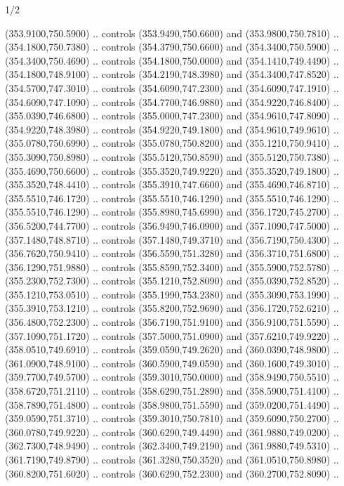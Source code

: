 \begin{flagdescription}{1/2}
\begin{scope}[xshift=0.5\flaglength]
\begin{scope}[scale=0.00745\flagwidth,xshift=-12.1mm,yshift=41.7mm]
\begin{scope}[y=0.80pt, x=0.80pt, yscale=-1, xscale=1, inner sep=0pt, outer sep=0pt]
\begin{scope}[cm={{1.33333,0.0,0.0,-1.33333,(0.0,114.66667)}}]
\begin{scope}[scale=0.100]
  (353.9100,750.5900) .. controls (353.9490,750.6600) and (353.9800,750.7810) ..
  (354.1800,750.7380) .. controls (354.3790,750.6600) and (354.3400,750.5900) ..
  (354.3400,750.4690) .. controls (354.1800,750.0000) and (354.1410,749.4490) ..
  (354.1800,748.9100) .. controls (354.2190,748.3980) and (354.3400,747.8520) ..
  (354.5700,747.3010) .. controls (354.6090,747.2300) and (354.6090,747.1910) ..
  (354.6090,747.1090) .. controls (354.7700,746.9880) and (354.9220,746.8400) ..
  (355.0390,746.6800) .. controls (355.0000,747.2300) and (354.9610,747.8090) ..
  (354.9220,748.3980) .. controls (354.9220,749.1800) and (354.9610,749.9610) ..
  (355.0780,750.6990) .. controls (355.0780,750.8200) and (355.1210,750.9410) ..
  (355.3090,750.8980) .. controls (355.5120,750.8590) and (355.5120,750.7380) ..
  (355.4690,750.6600) .. controls (355.3520,749.9220) and (355.3520,749.1800) ..
  (355.3520,748.4410) .. controls (355.3910,747.6600) and (355.4690,746.8710) ..
  (355.5510,746.1720) .. controls (355.5510,746.1290) and (355.5510,746.1290) ..
  (355.5510,746.1290) .. controls (355.8980,745.6990) and (356.1720,745.2700) ..
  (356.5200,744.7700) .. controls (356.9490,746.0900) and (357.1090,747.5000) ..
  (357.1480,748.8710) .. controls (357.1480,749.3710) and (356.7190,750.4300) ..
  (356.7620,750.9410) .. controls (356.5590,751.3280) and (356.3710,751.6800) ..
  (356.1290,751.9880) .. controls (355.8590,752.3400) and (355.5900,752.5780) ..
  (355.2300,752.7300) .. controls (355.1210,752.8090) and (355.0390,752.8520) ..
  (355.1210,753.0510) .. controls (355.1990,753.2380) and (355.3090,753.1990) ..
  (355.3910,753.1210) .. controls (355.8200,752.9690) and (356.1720,752.6210) ..
  (356.4800,752.2300) .. controls (356.7190,751.9100) and (356.9100,751.5590) ..
  (357.1090,751.1720) .. controls (357.5000,751.0900) and (357.6210,749.9220) ..
  (358.0510,749.6910) .. controls (359.0590,749.2620) and (360.0390,748.9800) ..
  (361.0900,748.9100) .. controls (360.5900,749.0590) and (360.1600,749.3010) ..
  (359.7700,749.5700) .. controls (359.3010,750.0000) and (358.9490,750.5510) ..
  (358.6720,751.2110) .. controls (358.6290,751.2890) and (358.5900,751.4100) ..
  (358.7890,751.4800) .. controls (358.9800,751.5590) and (359.0200,751.4490) ..
  (359.0590,751.3710) .. controls (359.3010,750.7810) and (359.6090,750.2700) ..
  (360.0780,749.9220) .. controls (360.6290,749.4490) and (361.9880,749.0200) ..
  (362.7300,748.9490) .. controls (362.3400,749.2190) and (361.9880,749.5310) ..
  (361.7190,749.8790) .. controls (361.3280,750.3520) and (361.0510,750.8980) ..
  (360.8200,751.6020) .. controls (360.6290,752.2300) and (360.2700,752.8090) ..

\end{scope}
\end{scope}
\end{scope}
\end{scope}
\end{scope}
\end{flagdescription}
